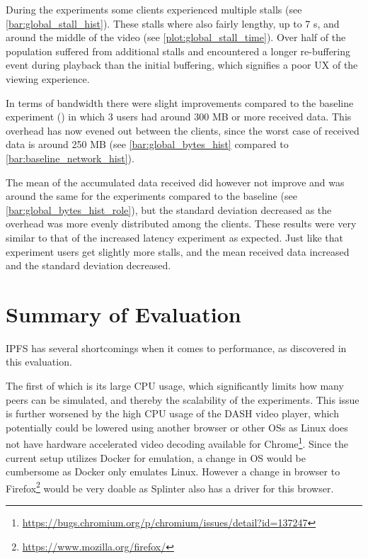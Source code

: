 During the experiments some clients experienced multiple stalls (see \autoref{bar:global_stall_hist}). These stalls where also fairly lengthy, up to 7 \ac{s}, and around the middle of the video (see \autoref{plot:global_stall_time}). Over half of the population suffered from additional stalls and encountered a longer re-buffering event during playback than the initial buffering, which signifies a poor \ac{UX} of the viewing experience.

\if{}


\fi

In terms of bandwidth there were slight improvements compared to the baseline experiment () in which 3 users had around 300 \ac{MB} or more received data. This overhead has now evened out between the clients, since the worst case of received data is around 250 \ac{MB} (see \autoref{bar:global_bytes_hist} compared to \autoref{bar:baseline_network_hist}).

The mean of the accumulated data received did however not improve and was around the same for the experiments compared to the baseline (see \autoref{bar:global_bytes_hist_role}), but the standard deviation decreased as the overhead was more evenly distributed among the clients.
These results were very similar to that of the increased latency experiment as expected. Just like that experiment users get slightly more stalls, and the mean received data increased and the standard deviation decreased.

\if{}


\fi


\FloatBarrier 
\section{Summary of Evaluation}
\ac{IPFS} has several shortcomings when it comes to performance, as discovered in this evaluation.

The first of which is its large \ac{CPU} usage, which significantly limits how many peers can be simulated, and thereby the scalability of the experiments.
This issue is further worsened by the high \ac{CPU} usage of the \ac{DASH} video player, which potentially could be lowered using another browser or other \acp{OS} as Linux does not have hardware accelerated video decoding available for Chrome\footnote{\url{https://bugs.chromium.org/p/chromium/issues/detail?id=137247}}. Since the current setup utilizes Docker for emulation, a change in \ac{OS} would be cumbersome as Docker only emulates Linux. However a change in browser to Firefox\footnote{\url{https://www.mozilla.org/firefox/}} would be very doable as Splinter also has a driver for this browser.

